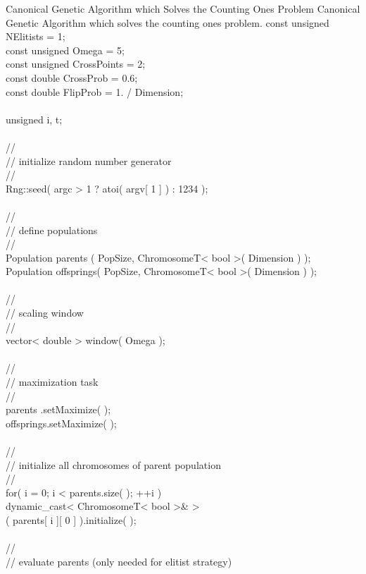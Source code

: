\begin{programlisting}{Canonical Genetic Algorithm which Solves the Counting Ones Problem}{
    Canonical Genetic Algorithm which solves the counting ones problem.}
    const unsigned NElitists   = 1;\\
    const unsigned Omega       = 5;\\
    const unsigned CrossPoints = 2;\\
    const double   CrossProb   = 0.6;\\
    const double   FlipProb    = 1. / Dimension;\\
\\
    unsigned i, t;\\
\\
    //\\
    // initialize random number generator\\
    //\\
    Rng::seed( argc > 1 ? atoi( argv[ 1 ] ) : 1234 );\\
\\
    //\\
    // define populations\\
    //\\
    Population parents   ( PopSize, ChromosomeT< bool >( Dimension ) );\\
    Population offsprings( PopSize, ChromosomeT< bool >( Dimension ) );\\
\\
    //\\
    // scaling window\\
    //\\
    vector< double > window( Omega );\\
\\
    //\\
    // maximization task\\
    //\\
    parents   .setMaximize( );\\
    offsprings.setMaximize( );\\
\\
    //\\
    // initialize all chromosomes of parent population\\
    //\\
    for( i = 0; i < parents.size( ); ++i )\\
        dynamic_cast< ChromosomeT< bool >& >\\
            ( parents[ i ][ 0 ] ).initialize( );\\
\\
    //\\
    // evaluate parents (only needed for elitist strategy)\\

\end{programlisting}
